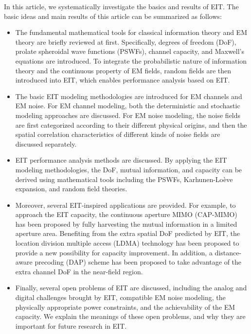 \documentclass[journal,twocolumn]{IEEEtran}
\begin{document}
In this article, we systematically investigate the basics and results of EIT. The basic ideas and main results of this article can be summarized as follows:
\begin{itemize}
\item{The fundamental mathematical tools for classical information theory and EM theory are briefly reviewed at first. Specifically, degrees of freedom (DoF), prolate spheroidal wave functions (PSWFs), channel capacity, and Maxwell's equations are introduced. To integrate the probabilistic nature of information theory and the continuous property of EM fields, random fields are then introduced into EIT, which enables performance analysis based on EIT. }
\item{The basic EIT modeling methodologies are introduced for EM channels and EM noise. For EM channel modeling, both the deterministic and stochastic modeling approaches are discussed. For EM noise modeling, the noise fields are first categorized according to their different physical origins, and then the spatial correlation characteristics of different kinds of noise fields are discussed separately. }
\item{EIT performance analysis methods are discussed. By applying the EIT modeling methodologies, the DoF, mutual information, and capacity can be derived using mathematical tools including the PSWFs, Karhunen-Lo\`{e}ve expansion, and random field theories. } 
\item Moreover, several EIT-inspired applications are provided. For example, to approach the EIT capacity, the continuous aperture MIMO (CAP-MIMO) has been proposed by fully harvesting the mutual information in a limited aperture area. Benefiting from the extra spatial DoF predicted by EIT, the location division multiple access (LDMA) technology has been proposed to provide a new possibility for capacity improvement. In addition, a distance-aware precoding (DAP) scheme has been proposed to take advantage of the extra channel DoF in the near-field region.  %
\item{Finally, several open problems of EIT are discussed, including the analog and digital challenges brought by EIT, compatible EM noise modeling, the physically appropriate power constraints, and the achievability of the EM capacity. We explain the meanings of these open problems, and why they are important for future research in EIT. }
\end{itemize}
\end{document}
